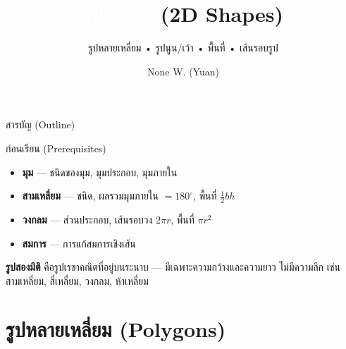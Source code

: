 \documentclass[11pt, aspectratio=169]{beamer}
\title[รูปสองมิติ]{\textcolor{white}{รูปสองมิติ} \textcolor{boxBlue!60}{(2D Shapes)}}
\subtitle{รูปหลายเหลี่ยม • รูปนูน/เว้า • พื้นที่ • เส้นรอบรูป }
\author[None W. (Yuan)]{None W. (Yuan)}
\date{}
\begin{document}
\begin{frame}[plain]\titlepage\end{frame}
\begin{frame}{สารบัญ (Outline)}\tableofcontents\end{frame}

\begin{frame}{ก่อนเรียน (Prerequisites)}
  \begin{explanation}
    \begin{itemize}
      \item \textbf{มุม} — ชนิดของมุม, มุมประกอบ, มุมภายใน
      \item \textbf{สามเหลี่ยม} — ชนิด, ผลรวมมุมภายใน $= 180^\circ$, พื้นที่ $\frac{1}{2}bh$
      \item \textbf{วงกลม} — ส่วนประกอบ, เส้นรอบวง $2\pi r$, พื้นที่ $\pi r^2$
      \item \textbf{สมการ} — การแก้สมการเชิงเส้น
    \end{itemize}
  \end{explanation}

  \begin{intuition}
    \textbf{รูปสองมิติ} คือรูปเรขาคณิตที่อยู่บนระนาบ — มีเฉพาะความกว้างและความยาว ไม่มีความลึก
    เช่น สามเหลี่ยม, สี่เหลี่ยม, วงกลม, ห้าเหลี่ยม
  \end{intuition}
\end{frame}

\section{รูปหลายเหลี่ยม (Polygons)}
\end{document}
